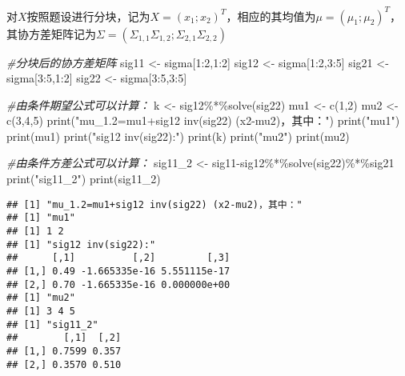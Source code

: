 \documentclass[
]{article}
\newenvironment{Shaded}{\begin{snugshade}}{\end{snugshade}}
\newcommand{\CommentTok}[1]{\textcolor[rgb]{0.56,0.35,0.01}{\textit{#1}}}
\newcommand{\DecValTok}[1]{\textcolor[rgb]{0.00,0.00,0.81}{#1}}
\newcommand{\FunctionTok}[1]{\textcolor[rgb]{0.00,0.00,0.00}{#1}}
\newcommand{\NormalTok}[1]{#1}
\newcommand{\OtherTok}[1]{\textcolor[rgb]{0.56,0.35,0.01}{#1}}
\newcommand{\SpecialCharTok}[1]{\textcolor[rgb]{0.00,0.00,0.00}{#1}}
\newcommand{\StringTok}[1]{\textcolor[rgb]{0.31,0.60,0.02}{#1}}
\begin{document}
对\(X\)按照题设进行分块，记为\(X=(x_1;x_2)^T\)，相应的其均值为\(\mu=(\mu_1;\mu_2)^T\)，
其协方差矩阵记为\(\Sigma=(\Sigma_{1,1}\Sigma_{1,2};\Sigma_{2,1}\Sigma_{2,2})\)

\begin{Shaded}
\begin{Highlighting}[]
\CommentTok{\#分块后的协方差矩阵}
\NormalTok{sig11 }\OtherTok{\textless{}{-}}\NormalTok{ sigma[}\DecValTok{1}\SpecialCharTok{:}\DecValTok{2}\NormalTok{,}\DecValTok{1}\SpecialCharTok{:}\DecValTok{2}\NormalTok{]}
\NormalTok{sig12 }\OtherTok{\textless{}{-}}\NormalTok{ sigma[}\DecValTok{1}\SpecialCharTok{:}\DecValTok{2}\NormalTok{,}\DecValTok{3}\SpecialCharTok{:}\DecValTok{5}\NormalTok{]}
\NormalTok{sig21 }\OtherTok{\textless{}{-}}\NormalTok{ sigma[}\DecValTok{3}\SpecialCharTok{:}\DecValTok{5}\NormalTok{,}\DecValTok{1}\SpecialCharTok{:}\DecValTok{2}\NormalTok{]}
\NormalTok{sig22 }\OtherTok{\textless{}{-}}\NormalTok{ sigma[}\DecValTok{3}\SpecialCharTok{:}\DecValTok{5}\NormalTok{,}\DecValTok{3}\SpecialCharTok{:}\DecValTok{5}\NormalTok{]}

\CommentTok{\#由条件期望公式可以计算：}
\NormalTok{k }\OtherTok{\textless{}{-}}\NormalTok{ sig12}\SpecialCharTok{\%*\%}\FunctionTok{solve}\NormalTok{(sig22)}
\NormalTok{mu1 }\OtherTok{\textless{}{-}} \FunctionTok{c}\NormalTok{(}\DecValTok{1}\NormalTok{,}\DecValTok{2}\NormalTok{)}
\NormalTok{mu2 }\OtherTok{\textless{}{-}} \FunctionTok{c}\NormalTok{(}\DecValTok{3}\NormalTok{,}\DecValTok{4}\NormalTok{,}\DecValTok{5}\NormalTok{)}
\FunctionTok{print}\NormalTok{(}\StringTok{"mu\_1.2=mu1+sig12 inv(sig22) (x2{-}mu2)，其中："}\NormalTok{)}
\FunctionTok{print}\NormalTok{(}\StringTok{"mu1"}\NormalTok{)}
\FunctionTok{print}\NormalTok{(mu1)}
\FunctionTok{print}\NormalTok{(}\StringTok{"sig12 inv(sig22):"}\NormalTok{)}
\FunctionTok{print}\NormalTok{(k)}
\FunctionTok{print}\NormalTok{(}\StringTok{"mu2"}\NormalTok{)}
\FunctionTok{print}\NormalTok{(mu2)}


\CommentTok{\#由条件方差公式可以计算：}
\NormalTok{sig11\_2 }\OtherTok{\textless{}{-}}\NormalTok{ sig11}\SpecialCharTok{{-}}\NormalTok{sig12}\SpecialCharTok{\%*\%}\FunctionTok{solve}\NormalTok{(sig22)}\SpecialCharTok{\%*\%}\NormalTok{sig21}
\FunctionTok{print}\NormalTok{(}\StringTok{"sig11\_2"}\NormalTok{)}
\FunctionTok{print}\NormalTok{(sig11\_2)}
\end{Highlighting}
\end{Shaded}

\begin{verbatim}
## [1] "mu_1.2=mu1+sig12 inv(sig22) (x2-mu2)，其中："
## [1] "mu1"
## [1] 1 2
## [1] "sig12 inv(sig22):"
##      [,1]          [,2]         [,3]
## [1,] 0.49 -1.665335e-16 5.551115e-17
## [2,] 0.70 -1.665335e-16 0.000000e+00
## [1] "mu2"
## [1] 3 4 5
## [1] "sig11_2"
##        [,1]  [,2]
## [1,] 0.7599 0.357
## [2,] 0.3570 0.510
\end{verbatim}
\end{document}
